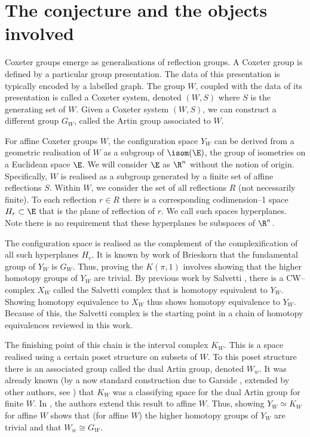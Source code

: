 % 

\section{The conjecture and the objects involved}
Coxeter groups emerge as generalisations of reflection groups. A Coxeter group is defined by a particular group presentation. The data of this presentation is typically encoded by a labelled graph. The group $W$, coupled with the data of its presentation is called a Coxeter system, denoted $(W,S)$ where $S$ is the generating set of $W$. Given a Coxeter system $(W,S)$, we can construct a different group $G_W$, called the Artin group associated to $W$.

For affine Coxeter groups $W$, the configuration space $Y_W$ can be derived from a geometric realisation of $W$ as a subgroup of $\isom(\E)$, the group of isometries on a Euclidean space $\E$. We will consider $\E$ as $\R^n$ without the notion of origin. Specifically, $W$ is realised as a subgroup generated by a finite set of affine reflections $S$. Within $W$, we consider the set of all reflections $R$ (not necessarily finite). To each reflection $r \in R$ there is a corresponding codimension--1 space $H_r \subset \E$ that is the plane of reflection of $r$. We call such spaces hyperplanes. Note there is no requirement that these hyperplanes be subspaces of $\R^n$.

The configuration space is realised as the complement of the complexification of all such hyperplanes $H_r$. It is known by work of Brieskorn \cite{brieskorn_fundamentalgruppe_1971} that the fundamental group of $Y_W$ is $G_W$. Thus, proving the $K(\pi,1)$ involves showing that the higher homotopy groups of $Y_W$ are trivial. By previous work by Salvetti \cite{salvetti_topology_1987,salvetti_homotopy_1994}, there is a CW--complex $X_W$ called the Salvetti complex that is homotopy equivalent to $Y_W$. Showing homotopy equivalence to $X_W$ thus shows homotopy equivalence to $Y_W$. Because of this, the Salvetti complex is the starting point in a chain of homotopy equivalences reviewed in this work.

The finishing point of this chain is the interval complex $K_W$. This is a space realised using a certain poset structure on subsets of $W$. To this poset structure there is an associated group called the dual Artin group, denoted $W_w$. It was already known (by a now standard construction due to Garside \cite{garside_braid_1969}, extended by other authors, see \cite{charney_etal_bestvina_2002}) that $K_W$ was a classifying space for the dual Artin group for finite $W$. In \cite{paolini_salvetti_kpi1_2021}, the authors extend this result to affine $W$. Thus, showing $Y_W \simeq K_W$ for affine $W$ shows that (for affine $W$) the higher homotopy groups of $Y_W$ are trivial and that $W_w \cong G_W$.

